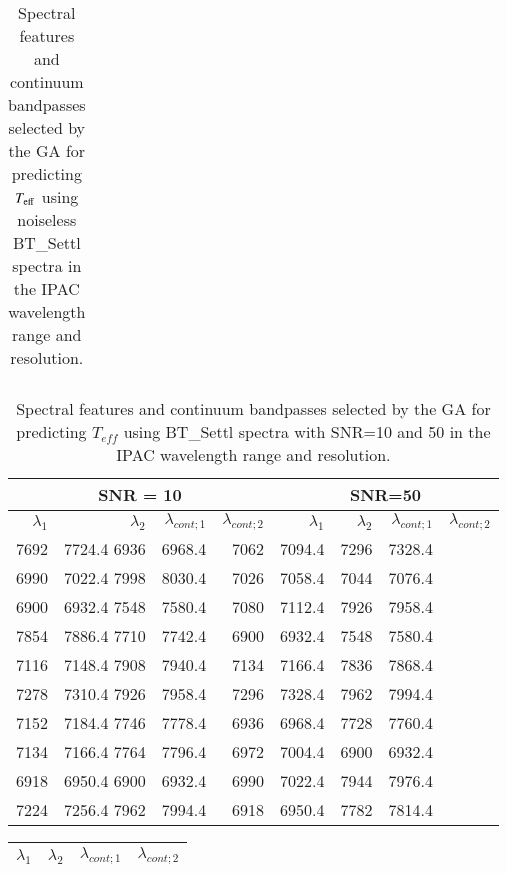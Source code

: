 \begin{appendix}
\begin{table}
\begin{center}
\begin{tabular}{rrrr}
\hline
\end{tabular}
\caption {Spectral features and continuum bandpasses selected by the
  GA for predicting $T_{\rm eff}$ using noiseless BT\_Settl spectra in
  the IPAC wavelength range and
  resolution.} \label{tab:ipac-teff-noiseless}
\end{center}
\end{table}


\begin{table*}
\begin{center}
\begin{tabular}{rrrr | rrrr}
  \hline
 \multicolumn{4}{c}{SNR = 10} &  \multicolumn{4}{c}{SNR=50} \\
  \hline
$\lambda_1$ & $\lambda_2$ & $\lambda_{cont;1}$ & $\lambda_{cont;2} $ & $\lambda_1$ & $\lambda_2$ & $\lambda_{cont;1}$ & $\lambda_{cont;2} $ \\ 
  \hline
7692 & 7724.4 	6936 & 6968.4  & 7062 & 7094.4 &  7296 & 7328.4 \\
6990 & 7022.4 	7998 & 8030.4  & 7026 & 7058.4 &  7044 & 7076.4 \\
6900 & 6932.4 	7548 & 7580.4  & 7080 & 7112.4 &  7926 & 7958.4 \\
7854 & 7886.4 	7710 & 7742.4  & 6900 & 6932.4 &  7548 & 7580.4 \\
7116 & 7148.4 	7908 & 7940.4  & 7134 & 7166.4 &  7836 & 7868.4 \\
7278 & 7310.4 	7926 & 7958.4  & 7296 & 7328.4 &  7962 & 7994.4 \\
7152 & 7184.4 	7746 & 7778.4  & 6936 & 6968.4 &  7728 & 7760.4 \\
7134 & 7166.4 	7764 & 7796.4  & 6972 & 7004.4 &  6900 & 6932.4 \\
6918 & 6950.4 	6900 & 6932.4  & 6990 & 7022.4 &  7944 & 7976.4 \\
7224 & 7256.4 	7962 & 7994.4  & 6918 & 6950.4 &  7782 & 7814.4 \\

\hline
\end{tabular}
\caption {Spectral features and continuum bandpasses selected by the
  GA for predicting $ T_{eff}$ using BT\_Settl spectra with SNR=10 and
  50 in the IPAC wavelength range and
  resolution.} \label{tab:ipac-teff-noisy}
\end{center}
\end{table*}


\begin{table}
\begin{center}
\begin{tabular}{rrrr}
  \hline
  $\lambda_1$ & $\lambda_2$ & $\lambda_{cont;1}$ & $\lambda_{cont;2} $ \\ 
  \hline


\end{tabular}
\end{center}
\end{table}
\end{appendix}
